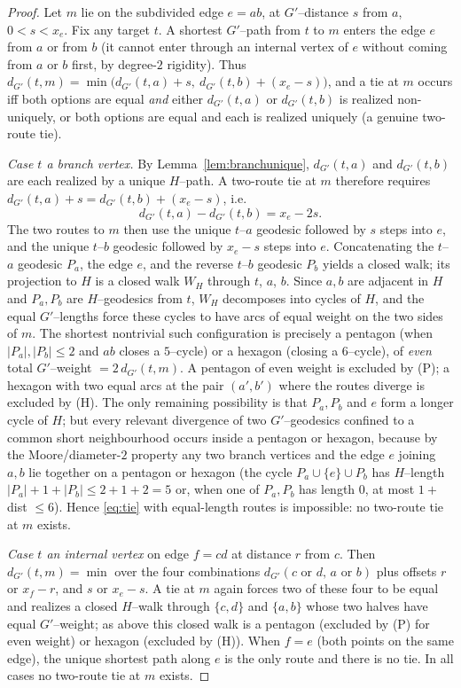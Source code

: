 \documentclass{amsart}
\theoremstyle{definition}
\begin{document}
\begin{proof}
Let $m$ lie on the subdivided edge $e=ab$, at $G'$--distance $s$ from $a$,
$0<s<x_e$. Fix any target $t$. A shortest $G'$--path from $t$ to $m$ enters the
edge $e$ from $a$ or from $b$ (it cannot enter through an internal vertex of $e$
without coming from $a$ or $b$ first, by degree-$2$ rigidity). Thus
$d_{G'}(t,m)=\min\big(d_{G'}(t,a)+s,\ d_{G'}(t,b)+(x_e-s)\big)$, and a tie at $m$
occurs iff both options are equal \emph{and} either $d_{G'}(t,a)$ or
$d_{G'}(t,b)$ is realized non-uniquely, or both options are equal and each is
realized uniquely (a genuine two-route tie). 

\emph{Case $t$ a branch vertex.} By Lemma~\ref{lem:branchunique}, $d_{G'}(t,a)$
and $d_{G'}(t,b)$ are each realized by a unique $H$--path. A two-route tie at $m$
therefore requires $d_{G'}(t,a)+s=d_{G'}(t,b)+(x_e-s)$, i.e.\
\begin{equation}\label{eq:tie}
d_{G'}(t,a)-d_{G'}(t,b)=x_e-2s .
\end{equation}
The two routes to $m$ then use the unique $t$--$a$ geodesic followed by $s$ steps
into $e$, and the unique $t$--$b$ geodesic followed by $x_e-s$ steps into $e$.
Concatenating the $t$--$a$ geodesic $P_a$, the edge $e$, and the reverse $t$--$b$
geodesic $P_b$ yields a closed walk; its projection to $H$ is a closed walk
$W_H$ through $t$, $a$, $b$. Since $a,b$ are adjacent in $H$ and $P_a,P_b$ are
$H$--geodesics from $t$, $W_H$ decomposes into cycles of $H$, and the equal
$G'$--lengths force these cycles to have arcs of equal weight on the two sides of
$m$. The shortest nontrivial such configuration is precisely a pentagon (when
$|P_a|,|P_b|\le2$ and $ab$ closes a $5$--cycle) or a hexagon (closing a
$6$--cycle), of \emph{even} total $G'$--weight $=2\,d_{G'}(t,m)$. A pentagon of
even weight is excluded by (P); a hexagon with two equal arcs at the pair
$(a',b')$ where the routes diverge is excluded by (H). The only remaining
possibility is that $P_a,P_b$ and $e$ form a longer cycle of $H$; but every
relevant divergence of two $G'$--geodesics confined to a common short
neighbourhood occurs inside a pentagon or hexagon, because by the Moore/diameter-$2$
property any two branch vertices and the edge $e$ joining $a,b$ lie together on a
pentagon or hexagon (the cycle $P_a\cup\{e\}\cup P_b$ has $H$--length
$|P_a|+1+|P_b|\le 2+1+2=5$ or, when one of $P_a,P_b$ has length $0$, at most
$1+\,$dist $\le6$). Hence \eqref{eq:tie} with equal-length routes is impossible:
no two-route tie at $m$ exists.

\emph{Case $t$ an internal vertex} on edge $f=cd$ at distance $r$ from $c$. Then
$d_{G'}(t,m)=\min$ over the four combinations
$d_{G'}(c\text{ or }d,\,a\text{ or }b)$ plus offsets $r$ or $x_f-r$, and $s$ or
$x_e-s$. A tie at $m$ again forces two of these four to be equal and realizes a
closed $H$--walk through $\{c,d\}$ and $\{a,b\}$ whose two halves have equal
$G'$--weight; as above this closed walk is a pentagon (excluded by (P) for even
weight) or hexagon (excluded by (H)). When $f=e$ (both points on the same edge),
the unique shortest path along $e$ is the only route and there is no tie. In all
cases no two-route tie at $m$ exists.
\end{proof}
\end{document}
